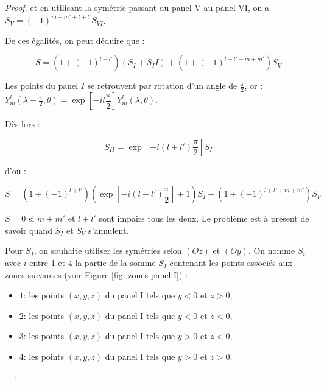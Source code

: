 \begin{proof}
et en utilisant la symétrie passant du panel V au panel VI, on a $S_{V} = (-1)^{m+m'+l+l'}S_{VI}$.

De ces égalités, on peut déduire que :

\begin{equation}
S=(1+(-1)^{l+l'})(S_I+S_II)+(1+(-1)^{l+l'+m+m'})S_V
\end{equation}

Les points du panel $I$ se retrouvent par rotation d'un angle de $\frac{\pi}{2}$, or : $Y_m^l\left(\lambda + \frac{\pi}{2}, \theta \right) = \exp \left[ - i l \dfrac{\pi}{2} \right] Y_m^l(\lambda, \theta)$.

Dès lors :

$$
S_{II} = \exp \left[ - i (l+l') \dfrac{\pi}{2} \right] S_I
$$

d'où :

\begin{equation}
S=\left(1+(-1)^{l+l'}\right)\left( \exp \left[ - i (l+l') \dfrac{\pi}{2} \right] +1 \right) S_I + (1+(-1)^{l+l'+m+m'})S_V
\label{eq:pdt scal nul 1}
\end{equation}

$S=0$ si $m+m'$ et $l+l'$ sont impairs tous les deux.
Le problème est à présent de savoir quand $S_I$ et $S_V$ s'annulent. 

Pour $S_I$, on souhaite utiliser les symétries selon $(Oz)$ et $(Oy)$. On nomme $S_i$ avec $i$ entre 1 et 4 la partie de la somme $S_I$ contenant les points associés aux zones suivantes (voir Figure \ref{fig: zones panel I}) :

\begin{itemize}
\item $1$: les points $(x,y,z)$ du panel I tels que $y<0$ et $z>0$,
\item $2$: les points $(x,y,z)$ du panel I tels que $y<0$ et $z<0$,
\item $3$: les points $(x,y,z)$ du panel I tels que $y>0$ et $z<0$,
\item $4$: les points $(x,y,z)$ du panel I tels que $y>0$ et $z>0$.
\end{itemize}

\begin{figure}
\begin{center}
\end{center}
\end{figure}
\end{proof}
